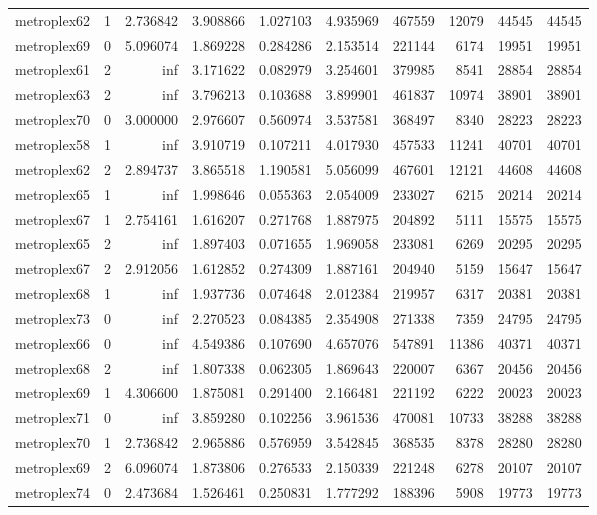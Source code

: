 \documentclass[../../../thesis.tex]{subfiles}
\begin{document}
\begin{longtable}{|l|r|r|r|r|r|r|r|r|r|}
metroplex62 & 1 & 2.736842 & 3.908866 & 1.027103 & 4.935969 & 467559 & 12079 & 44545 & 44545 \\
metroplex69 & 0 & 5.096074 & 1.869228 & 0.284286 & 2.153514 & 221144 & 6174 & 19951 & 19951 \\
metroplex61 & 2 & inf & 3.171622 & 0.082979 & 3.254601 & 379985 & 8541 & 28854 & 28854 \\
metroplex63 & 2 & inf & 3.796213 & 0.103688 & 3.899901 & 461837 & 10974 & 38901 & 38901 \\
metroplex70 & 0 & 3.000000 & 2.976607 & 0.560974 & 3.537581 & 368497 & 8340 & 28223 & 28223 \\
metroplex58 & 1 & inf & 3.910719 & 0.107211 & 4.017930 & 457533 & 11241 & 40701 & 40701 \\
metroplex62 & 2 & 2.894737 & 3.865518 & 1.190581 & 5.056099 & 467601 & 12121 & 44608 & 44608 \\
metroplex65 & 1 & inf & 1.998646 & 0.055363 & 2.054009 & 233027 & 6215 & 20214 & 20214 \\
metroplex67 & 1 & 2.754161 & 1.616207 & 0.271768 & 1.887975 & 204892 & 5111 & 15575 & 15575 \\
metroplex65 & 2 & inf & 1.897403 & 0.071655 & 1.969058 & 233081 & 6269 & 20295 & 20295 \\
metroplex67 & 2 & 2.912056 & 1.612852 & 0.274309 & 1.887161 & 204940 & 5159 & 15647 & 15647 \\
metroplex68 & 1 & inf & 1.937736 & 0.074648 & 2.012384 & 219957 & 6317 & 20381 & 20381 \\
metroplex73 & 0 & inf & 2.270523 & 0.084385 & 2.354908 & 271338 & 7359 & 24795 & 24795 \\
metroplex66 & 0 & inf & 4.549386 & 0.107690 & 4.657076 & 547891 & 11386 & 40371 & 40371 \\
metroplex68 & 2 & inf & 1.807338 & 0.062305 & 1.869643 & 220007 & 6367 & 20456 & 20456 \\
metroplex69 & 1 & 4.306600 & 1.875081 & 0.291400 & 2.166481 & 221192 & 6222 & 20023 & 20023 \\
metroplex71 & 0 & inf & 3.859280 & 0.102256 & 3.961536 & 470081 & 10733 & 38288 & 38288 \\
metroplex70 & 1 & 2.736842 & 2.965886 & 0.576959 & 3.542845 & 368535 & 8378 & 28280 & 28280 \\
metroplex69 & 2 & 6.096074 & 1.873806 & 0.276533 & 2.150339 & 221248 & 6278 & 20107 & 20107 \\
metroplex74 & 0 & 2.473684 & 1.526461 & 0.250831 & 1.777292 & 188396 & 5908 & 19773 & 19773 \\

\end{longtable}
\end{document}

